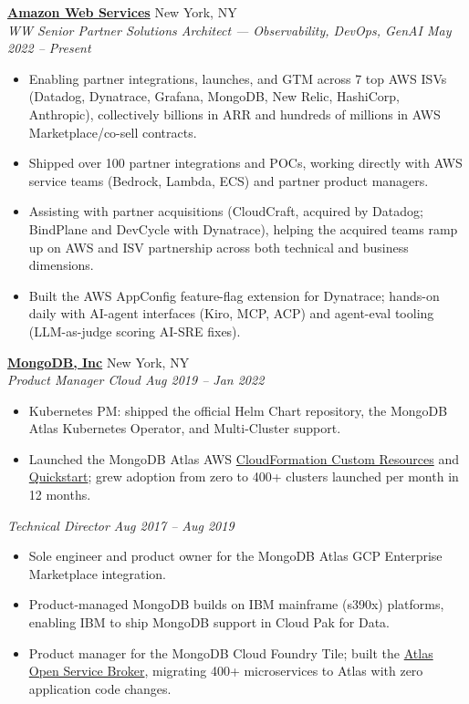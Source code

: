 \documentclass[10pt,letterpaper]{article}
\begin{document}
\textbf{\href{https://aws.amazon.com/}{Amazon Web Services}} \hfill {\small\color{lighttext} New York, NY}\\
{\small\itshape\color{accent} WW Senior Partner Solutions Architect --- Observability, DevOps, GenAI \hfill May 2022 -- Present}
\begin{itemize}
\item {\small Enabling partner integrations, launches, and GTM across 7 top AWS ISVs (Datadog, Dynatrace, Grafana, MongoDB, New Relic, HashiCorp, Anthropic), collectively billions in ARR and hundreds of millions in AWS Marketplace/co-sell contracts.}
\item {\small Shipped over 100 partner integrations and POCs, working directly with AWS service teams (Bedrock, Lambda, ECS) and partner product managers.}
\item {\small Assisting with partner acquisitions (CloudCraft, acquired by Datadog; BindPlane and DevCycle with Dynatrace), helping the acquired teams ramp up on AWS and ISV partnership across both technical and business dimensions.}
\item {\small Built the AWS AppConfig feature-flag extension for Dynatrace; hands-on daily with AI-agent interfaces (Kiro, MCP, ACP) and agent-eval tooling (LLM-as-judge scoring AI-SRE fixes).}
\end{itemize}

\textbf{\href{https://www.mongodb.com/}{MongoDB, Inc}} \hfill {\small\color{lighttext} New York, NY}\\
{\small\itshape\color{accent} Product Manager Cloud \hfill Aug 2019 -- Jan 2022}
\begin{itemize}
\item {\small Kubernetes PM: shipped the official Helm Chart repository, the MongoDB Atlas Kubernetes Operator, and Multi-Cluster support.}
\item {\small Launched the MongoDB Atlas AWS \href{https://github.com/mongodb/mongodbatlas-cloudformation-resources}{CloudFormation Custom Resources} and \href{https://aws.amazon.com/quickstart/architecture/mongodb-atlas/}{Quickstart}; grew adoption from zero to 400+ clusters launched per month in 12 months.}
\end{itemize}

{\small\itshape\color{accent} Technical Director \hfill Aug 2017 -- Aug 2019}
\begin{itemize}
\item {\small Sole engineer and product owner for the MongoDB Atlas GCP Enterprise Marketplace integration.}
\item {\small Product-managed MongoDB builds on IBM mainframe (s390x) platforms, enabling IBM to ship MongoDB support in Cloud Pak for Data.}
\item {\small Product manager for the MongoDB Cloud Foundry Tile; built the \href{https://github.com/mongodb/atlas-osb}{Atlas Open Service Broker}, migrating 400+ microservices to Atlas with zero application code changes.}
\end{itemize}
\end{document}
